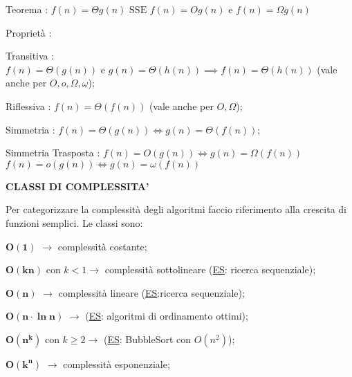 \documentclass[8pt]{extarticle}
\begin{document}
\begin{formulario}
	\begin{descr}{1}
		\item[Teorema]: $f(n)=\Theta g(n) \text{ SSE } f(n)=O g(n) \text{ e } f(n)=\Omega g(n)$
		\item[Proprietà]: 
		\begin{descr}{0}
			\item[Transitiva]: $f(n)=\Theta(g(n))\text{ e }g(n)=\Theta(h(n)) \implies f(n)=\Theta(h(n))$ \quad (vale anche per $O,o,\Omega,\omega$);
			\item[Riflessiva]: $f(n)=\Theta(f(n))$ \quad (vale anche per $O,\Omega$);
			\item[Simmetria]: $f(n)=\Theta(g(n))\Leftrightarrow g(n)=\Theta(f(n))$;
			\item[Simmetria Trasposta]: $f(n)=O(g(n))\Leftrightarrow g(n)=\Omega(f(n))$ $f(n)=o(g(n))\Leftrightarrow g(n)=\omega(f(n))$
		\end{descr}
	\end{descr}
\myRule
	\begin{tcenter}
\textbf{CLASSI DI COMPLESSITA'}
	\end{tcenter}
Per categorizzare la complessità degli algoritmi faccio riferimento alla crescita di funzioni semplici. Le classi sono:\\
	\begin{descr}{0}
	\item[$\bm{O(1)}$] $\rightarrow$ complessità costante;
	\item[$\bm{O(kn)}$] con $k<1 \rightarrow$ complessità sottolineare (\underline{ES}: ricerca sequenziale);
	\item[$\bm{O(n)}$] $\rightarrow$ complessità lineare (\underline{ES}:ricerca sequenziale);
	\item[$\bm{O(n\cdot \ln n)}$] $\rightarrow$ (\underline{ES}: algoritmi di ordinamento ottimi);
	\item[$\bm{O(n^k)}$] con $k\geq 2\rightarrow$ (\underline{ES}: BubbleSort con $O(n^2)$); 
	\item[$\bm{O(k^n)}$] $\rightarrow$ complessità esponenziale;
	\end{descr}
\myRule


\end{formulario}
\end{document}
